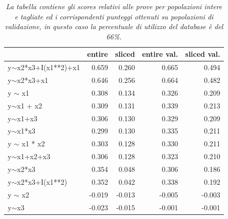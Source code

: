\documentclass[a4paper]{report}
\begin{document}
\begin{table}[h!btp]
\begin{tabular}{lrrrr}
\toprule
{} &  entire &  sliced &  entire val. &  sliced val. \\
\midrule
y$\sim$x2*x3+I(x1**2)+x1 &         0.659 &         0.260 &             0.665 &             0.494 \\
y$\sim$x2*x3+x1          &         0.646 &         0.256 &             0.664 &             0.482 \\
y $\sim$ x1              &         0.308 &         0.134 &             0.326 &             0.209 \\
y$\sim$x1 + x2           &         0.309 &         0.131 &             0.339 &             0.213 \\
y$\sim$x1+x3             &         0.306 &         0.130 &             0.329 &             0.209 \\
y$\sim$x1*x3             &         0.299 &         0.130 &             0.335 &             0.211 \\
y $\sim$ x1 * x2         &         0.303 &         0.128 &             0.330 &             0.211 \\
y$\sim$x1+x2+x3          &         0.306 &         0.128 &             0.323 &             0.210 \\
y$\sim$x2*x3             &         0.354 &         0.048 &             0.306 &             0.186 \\
y$\sim$x2*x3+I(x1**2)    &         0.352 &         0.042 &             0.338 &             0.192 \\
y $\sim$ x2              &        -0.019 &        -0.013 &            -0.005 &            -0.003 \\
y$\sim$x3                &        -0.023 &        -0.015 &            -0.001 &            -0.001 \\
\bottomrule
\end{tabular}
\caption{\textit{La tabella contiene gli scores relativi alle prove per popolazioni intere e tagliate ed i corrispondenti punteggi  ottenuti su popolazioni di validazione, in questo caso la percentuale di utilizzo del database è del 66\%.}}
\end{table}
\end{document}
